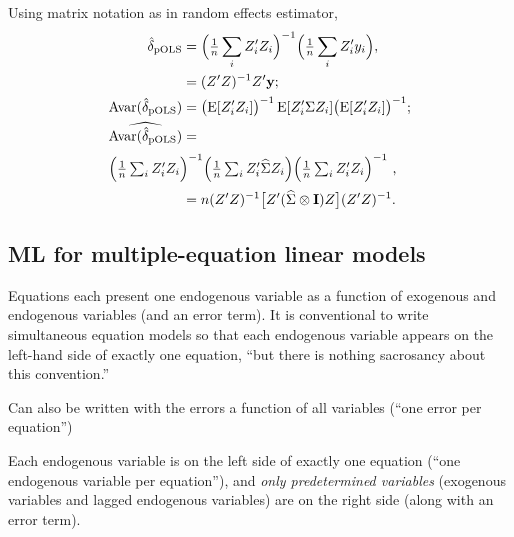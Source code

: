 \documentclass[8pt,letterpaper, landscape]{extarticle} %
\newcommand{\mI}{\ensuremath{\mathbf{I}}}
\begin{document}
\begin{multicols}{3}
\begin{description}
Using matrix notation as in random effects estimator,
\begin{align*}
\hat{\delta}_{\text{pOLS}} &= \Bigl ( \tfrac{1}{n} \sum_{i} Z_{i}' Z_i \Bigr )^{-1} \Bigl ( \tfrac{1}{n} \sum_{i} Z_{i}' y_i \Bigr ) , \\
&= (Z'Z)^{-1} Z' \mathbf{y} ; \\
\Avar(\hat{\delta}_{\text{pOLS}}) &= \bigl ( \E [Z_{i}' Z_i]  \bigr )^{-1} \E [Z_{i}' \Sigma Z_i] \bigl ( \E [Z_{i}' Z_i]  \bigr )^{-1} ; \\
\widehat{\Avar(\hat{\delta}_{\text{pOLS}})} &= \\
\intertext{\hfill $ \Bigl ( \tfrac{1}{n} \sum_{i} Z_{i}' Z_i \Bigr )^{-1} \Bigl ( \tfrac{1}{n} \sum_{i} Z_{i}' \widehat{\Sigma} Z_i \Bigr ) \Bigl ( \tfrac{1}{n} \sum_{i} Z_{i}' Z_i \Bigr )^{-1} $ ,}
&= n (Z'Z)^{-1} \bigl [ Z' (\widehat{\Sigma} \otimes \mI) Z \bigr ] (Z'Z)^{-1}.
\end{align*}

\subsection{ML for multiple-equation linear models}
 Equations each present one endogenous variable as a function of exogenous and endogenous variables (and an error term). It is conventional to write simultaneous equation models so that each endogenous variable appears on the left-hand side of exactly one equation, ``but there is nothing sacrosancy about this convention.''

Can also be written with the errors a function of all variables (``one error per equation'')

 Each endogenous variable is on the left side of exactly one equation (``one endogenous variable per equation''), and \textit{only predetermined variables} (exogenous variables and lagged endogenous variables) are on the right side (along with an error term).


\end{description}
\end{multicols}
\end{document}
